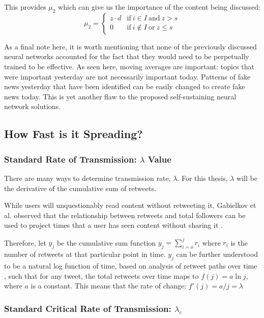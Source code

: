 \documentclass[preprint,review,12pt]{elsarticle}
\begin{document}
This provides $\mu_2$ which can give us the importance of the content being discussed:
\begin{equation}
\label{mu_2 equation}
    \mu_2 = \begin{cases}
    z\cdot d  & \text{if}\ i \in I\ \text{and}\  z > s \\
    0\  & \text{if}\ i \notin I \ \text{or} \ z \leq s
    \end{cases}
\end{equation}

As a final note here, it is worth mentioning that none of the previously discussed neural networks accounted for the fact that they would need to be perpetually trained to be effective. As seen here, moving averages are important: topics that were important yesterday are not necessarily important today. Patterns of fake news yesterday that have been identified can be easily changed to create fake news today. This is yet another flaw to the proposed self-sustaining neural network solutions.

\subsection{How Fast is it Spreading?}
\subsubsection{Standard Rate of Transmission: $\lambda$ Value}
There are many ways to determine transmission rate, $\lambda$. For this thesis, $\lambda$ will be the derivative of the cumulative sum of retweets. 

While users will unquestionably read content without retweeting it, Gabielkov et al. observed that the relationship between retweets and total followers can be used to project times that a user has seen content without sharing it \cite{gabielkov2016social}.

Therefore, let $y_j$ be the cumulative sum function $y_j = \sum_{i=o}^j r_i$ where $r_i$ is the number of retweets at that particular point in time. $y_j$ can be further understood to be a natural log function of time, based on analysis of retweet paths over time \cite{gabielkov2016social,starbird2014rumors,mention2018twitter}, such that for any tweet, the total retweets over time maps to $f(j) = a \ln j$, where $a$ is a constant. This means that the rate of change: $f'(j) = a /j = \lambda$

\subsubsection{Standard Critical Rate of Transmission: $\lambda_c$}
\end{document}

